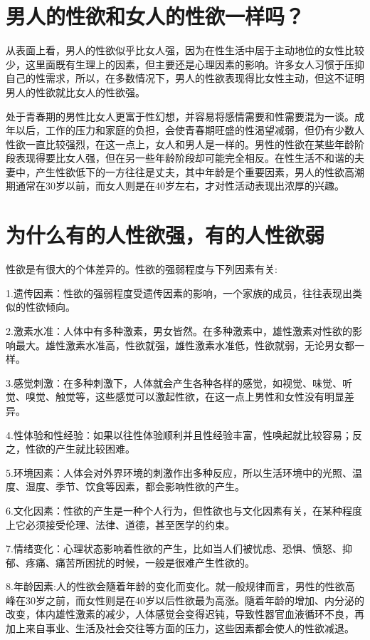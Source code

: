 \documentclass[12pt,UTF8]{ctexbook}
\begin{document}
\chapter{男人的性欲和女人的性欲一样吗？}

从表面上看，男人的性欲似乎比女人强，因为在性生活中居于主动地位的女性比较少，这里面既有生理上的因素，但主要还是心理因素的影响。许多女人习惯于压抑自己的性需求，所以，在多数情况下，男人的性欲表现得比女性主动，但这不证明男人的性欲就比女人的性欲强。

处于青春期的男性比女人更富于性幻想，并容易将感情需要和性需要混为一谈。成年以后，工作的压力和家庭的负担，会使青春期旺盛的性渴望减弱，但仍有少数人性欲一直比较强烈，在这一点上，女人和男人是一样的。男性的性欲在某些年龄阶段表现得要比女人强，但在另一些年龄阶段却可能完全相反。在性生活不和谐的夫妻中，产生性欲低下的一方往往是丈夫，其中年龄是个重要因素，男人的性欲高潮期通常在30岁以前，而女人则是在40岁左右，才对性活动表现出浓厚的兴趣。

\chapter{为什么有的人性欲强，有的人性欲弱}

性欲是有很大的个体差异的。性欲的强弱程度与下列因素有关:

1.遗传因素：性欲的强弱程度受遗传因素的影响，一个家族的成员，往往表现出类似的性欲倾向。

2.激素水准：人体中有多种激素，男女皆然。在多种激素中，雄性激素对性欲的影响最大。雄性激素水准高，性欲就强，雄性激素水准低，性欲就弱，无论男女都一样。

3.感觉刺激：在多种刺激下，人体就会产生各种各样的感觉，如视觉、味觉、听觉、嗅觉、触觉等，这些感觉可以激起性欲，在这一点上男性和女性没有明显差异。

4.性体验和性经验：如果以往性体验顺利并且性经验丰富，性唤起就比较容易；反之，性欲的产生就比较困难。

5.环境因素：人体会对外界环境的刺激作出多种反应，所以生活环境中的光照、温度、湿度、季节、饮食等因素，都会影响性欲的产生。

6.文化因素：性欲的产生是一种个人行为，但性欲也与文化因素有关，在某种程度上它必须接受伦理、法律、道德，甚至医学的约束。

7.情绪变化：心理状态影响着性欲的产生，比如当人们被忧虑、恐惧、愤怒、抑郁、疼痛、痛苦所困扰的时候，一般是很难产生性欲的。

8.年龄因素:人的性欲会隨着年龄的变化而变化。就一般规律而言，男性的性欲高峰在30岁之前，而女性则是在40岁以后性欲最为高涨。隨着年龄的增加、内分泌的改变，体内雄性激素的减少，人体感觉会变得迟钝，导致性器官血液循环不良，再加上来自事业、生活及社会交往等方面的压力，这些因素都会使人的性欲减退。
\end{document}
